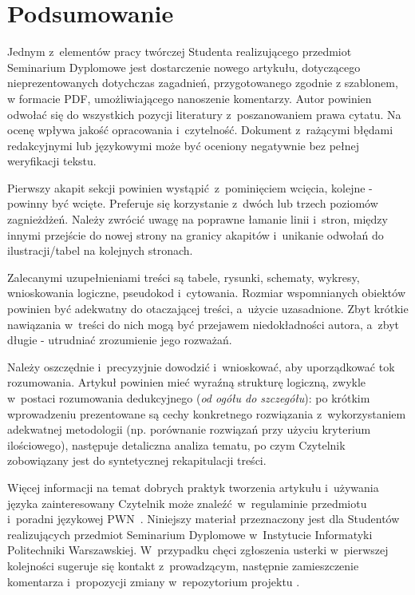 \section{Podsumowanie}
\label{sec:summary}

Jednym z~elementów pracy twórczej Studenta realizującego przedmiot Seminarium Dyplomowe jest dostarczenie nowego artykułu, dotyczącego nieprezentowanych dotychczas zagadnień, przygotowanego zgodnie z szablonem, w formacie PDF, umożliwiającego nanoszenie komentarzy. Autor powinien odwołać się do wszystkich pozycji literatury z~poszanowaniem prawa cytatu. Na ocenę wpływa jakość opracowania i~czytelność. Dokument z~rażącymi błędami redakcyjnymi lub językowymi może być oceniony negatywnie bez pełnej weryfikacji tekstu.

Pierwszy akapit sekcji powinien wystąpić z~pominięciem wcięcia, kolejne - powinny być wcięte. Preferuje się korzystanie z~dwóch lub trzech poziomów zagnieżdżeń. Należy zwrócić uwagę na poprawne łamanie linii i~stron, między innymi przejście do nowej strony na granicy akapitów i~unikanie odwołań do ilustracji/tabel na kolejnych stronach.

Zalecanymi uzupełnieniami treści są tabele, rysunki, schematy, wykresy, wnioskowania logiczne, pseudokod i~cytowania. Rozmiar wspomnianych obiektów powinien być adekwatny do otaczającej treści, a~użycie uzasadnione. Zbyt krótkie nawiązania w~treści do nich mogą być przejawem niedokładności autora, a~zbyt długie - utrudniać zrozumienie jego rozważań.

Należy oszczędnie i~precyzyjnie dowodzić i~wnioskować, aby uporządkować tok rozumowania. Artykuł powinien mieć wyraźną strukturę logiczną, zwykle w~postaci rozumowania dedukcyjnego (\emph{od ogółu do szczegółu}): po krótkim wprowadzeniu prezentowane są cechy konkretnego rozwiązania z~wykorzystaniem adekwatnej metodologii (np. porównanie rozwiązań przy użyciu kryterium ilościowego), następuje detaliczna analiza tematu, po czym Czytelnik zobowiązany jest do syntetycznej rekapitulacji treści.

Więcej informacji na temat dobrych praktyk tworzenia artykułu i~używania języka zainteresowany Czytelnik może znaleźć w~regulaminie przedmiotu i~poradni językowej PWN~\cite{ref:pwn}. Niniejszy materiał przeznaczony jest dla Studentów realizujących przedmiot Seminarium Dyplomowe w~Instytucie Informatyki Politechniki Warszawskiej. W~przypadku chęci zgłoszenia usterki w~pierwszej kolejności sugeruje się kontakt z~prowadzącym, następnie zamieszczenie komentarza i~propozycji zmiany w~repozytorium projektu \cite{ref:github}.
